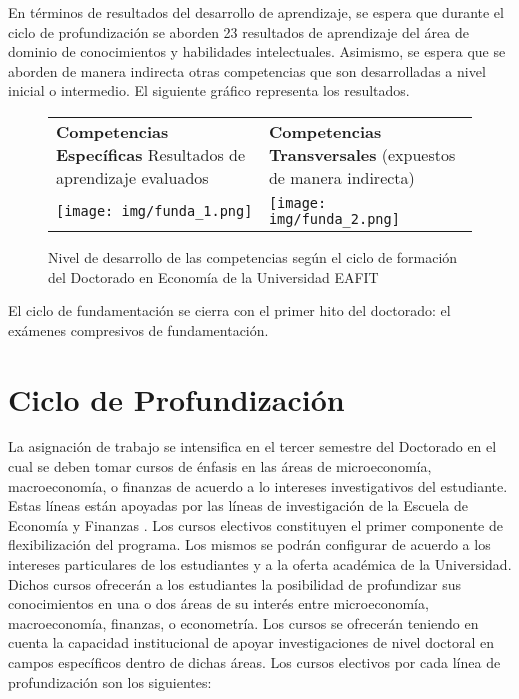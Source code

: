 En términos de resultados del desarrollo de aprendizaje, se espera que durante el ciclo de profundización se aborden 23 resultados de aprendizaje del área de dominio de conocimientos y habilidades intelectuales. Asimismo, se espera que se aborden de manera indirecta otras competencias que son desarrolladas a nivel inicial o intermedio. El siguiente gráfico representa los resultados. 

\begin{figure}[H]
\caption{Nivel de desarrollo de las competencias según el ciclo de formación del Doctorado en Economía de la Universidad EAFIT \label{Estructura} }
\begin{center}
\begin{tabular}{p{}|p{}}
   \textbf{Competencias Específicas}
Resultados de aprendizaje evaluados
  & \textbf{Competencias Transversales} (expuestos de manera indirecta)  \\
  \texttt{[image: img/funda\_1.png]}   &  \texttt{[image: img/funda\_2.png]}
\end{tabular}

\end{center}
\end{figure}

El ciclo de fundamentación se cierra con el primer hito del doctorado: el exámenes compresivos de fundamentación. 

\section{Ciclo de Profundización}

La asignación de trabajo se intensifica en el tercer semestre del Doctorado en el cual se deben tomar cursos de énfasis en las áreas de microeconomía, macroeconomía, o finanzas de acuerdo a lo intereses investigativos del estudiante. Estas líneas están apoyadas por las líneas de investigación de la Escuela de Economía y Finanzas . Los cursos electivos constituyen el primer componente de flexibilización del programa. Los mismos se podrán configurar de acuerdo a los intereses particulares de los estudiantes y a la oferta académica de la Universidad. Dichos cursos ofrecerán a los estudiantes la posibilidad de profundizar sus conocimientos en una o dos áreas de su interés entre microeconomía, macroeconomía, finanzas, o econometría. Los cursos se ofrecerán teniendo en cuenta la capacidad institucional de apoyar investigaciones de nivel doctoral en campos específicos dentro de dichas áreas. Los cursos electivos por cada línea de profundización son los siguientes: 

